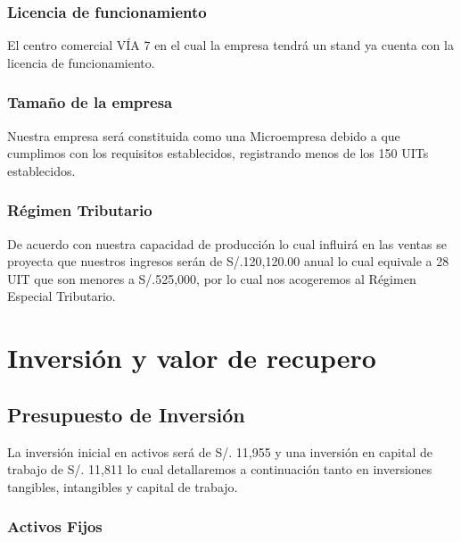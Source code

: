 \documentclass[a4paper,openright,12pt]{book}
\begin{document}
\subsection{Licencia de funcionamiento}
El centro comercial VÍA 7 en el cual la empresa tendrá un stand ya cuenta con la licencia de funcionamiento.

\subsection{Tamaño de la empresa}
Nuestra empresa será constituida como una Microempresa debido a que cumplimos con los requisitos establecidos, registrando menos de los 150 UITs establecidos.

\subsection{Régimen Tributario}
De acuerdo con nuestra capacidad de producción lo cual influirá en las ventas se proyecta que nuestros ingresos serán de S/.120,120.00 anual lo cual equivale a 28 UIT que son menores a S/.525,000, por lo cual nos acogeremos al Régimen Especial Tributario.

\chapter{Inversión y valor de recupero}\label{cap.2}

\section{Presupuesto de Inversión}

La inversión inicial en activos será de S/. 11,955 y una inversión en capital de trabajo de S/. 11,811 lo cual detallaremos a continuación tanto en inversiones tangibles, intangibles y capital de trabajo.

\subsection{Activos Fijos}
\end{document}
